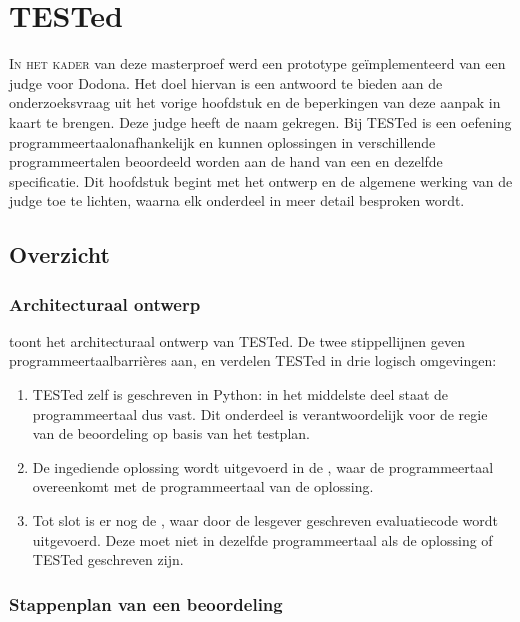 \chapter{TESTed}\label{ch:tested}

\lettrine{I}{n het kader} van deze masterproef werd een prototype geïmplementeerd van een judge voor Dodona.
Het doel hiervan is een antwoord te bieden aan de onderzoeksvraag uit het vorige hoofdstuk en de beperkingen van deze aanpak in kaart te brengen.
Deze judge heeft de naam  gekregen.
Bij TESTed is een oefening programmeertaalonafhankelijk en kunnen oplossingen in verschillende programmeertalen beoordeeld worden aan de hand van een en dezelfde specificatie.
Dit hoofdstuk begint met het ontwerp en de algemene werking van de judge toe te lichten, waarna elk onderdeel in meer detail besproken wordt.

\section{Overzicht}\label{sec:ontwerp}

\subsection{Architecturaal ontwerp}\label{subsec:architecturaal-overzicht}

 toont het architecturaal ontwerp van TESTed.
De twee stippellijnen geven programmeertaalbarrières aan, en verdelen TESTed in drie logisch omgevingen:

\begin{enumerate}
    \item TESTed zelf is geschreven in Python: in het middelste deel staat de programmeertaal dus vast.
    Dit onderdeel is verantwoordelijk voor de regie van de beoordeling op basis van het testplan.
    \item De ingediende oplossing wordt uitgevoerd in de , waar de programmeertaal overeenkomt met de programmeertaal van de oplossing.
    \item Tot slot is er nog de , waar door de lesgever geschreven evaluatiecode wordt uitgevoerd.
    Deze moet niet in dezelfde programmeertaal als de oplossing of TESTed geschreven zijn.
\end{enumerate}

\subsection{Stappenplan van een beoordeling}\label{subsec:stappenplan-van-een-beoordeling}

